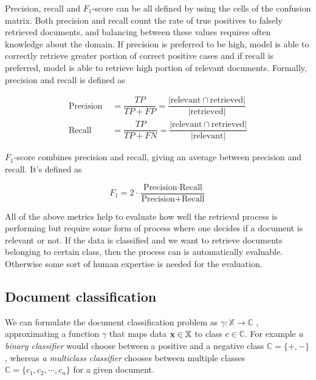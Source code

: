 Precision, recall and $F_1$-score can be all defined by using the cells of the confusion matrix. Both precision and recall count the rate of true positives to falsely retrieved documents, and balancing between these values requires often knowledge about the domain. If precision is preferred to be high, model is able to correctly retrieve greater portion of correct positive cases and if recall is preferred, model is able to retrieve high portion of relevant documents. Formally, precision and recall is defined as

\begin{align}
    \text{Precision } &= \dfrac{TP}{TP + FP} = \dfrac{|\text{relevant} \cap \text{retrieved}|}{|\text{retrieved}|}\\
    \text{Recall } &= \dfrac{TP}{TP + FN} = \dfrac{|\text{relevant} \cap \text{retrieved}|}{|\text{relevant}|}
\end{align}

$F_1$-score combines precision and recall, giving an average between precision and recall. It's defined as

\begin{equation}
    F_1 = 2 \cdot \dfrac{\text{Precision} \cdot \text{Recall}}{\text{Precision} + \text{Recall}}
\end{equation}

All of the above metrics help to evaluate how well the retrieval process is performing but require some form of process where one decides if a document is relevant or not. If the data is classified and we want to retrieve documents belonging to certain class, then the process can is automatically evaluable. Otherwise some sort of human expertise is needed for the evaluation.

\subsection{Document classification} \label{chap-bg-classification}

We can formulate the document classification problem as $\gamma: \mathbb{X} \rightarrow \mathbb{C}$ \cite{Manning:2008:IIR:1394399}, approximating a function $\gamma$ that maps data $\mathbf{x} \in \mathbb{X}$ to class $c \in \mathbb{C}$. For example \emph{a binary classifier} would choose between a positive and a negative class $\mathbb{C} = \{+, -\}$, whereas \emph{a multiclass classifier} chooses between multiple classes $\mathbb{C} = \{c_1, c_2, \cdots, c_n\}$ for a given document.

